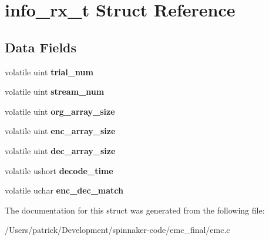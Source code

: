 \hypertarget{structinfo__rx__t}{}\section{info\+\_\+rx\+\_\+t Struct Reference}
\label{structinfo__rx__t}
\subsection*{Data Fields}
\begin{DoxyCompactItemize}
\item 
volatile uint {\bfseries trial\+\_\+num}\hypertarget{structinfo__rx__t_acaca41d7925c2322500b42835a31578f}{}\label{structinfo__rx__t_acaca41d7925c2322500b42835a31578f}

\item 
volatile uint {\bfseries stream\+\_\+num}\hypertarget{structinfo__rx__t_a2365c36107afec7da22200ed1fdd51bc}{}\label{structinfo__rx__t_a2365c36107afec7da22200ed1fdd51bc}

\item 
volatile uint {\bfseries org\+\_\+array\+\_\+size}\hypertarget{structinfo__rx__t_a47b036de602064b79b25f47190f40545}{}\label{structinfo__rx__t_a47b036de602064b79b25f47190f40545}

\item 
volatile uint {\bfseries enc\+\_\+array\+\_\+size}\hypertarget{structinfo__rx__t_a6134272a13fdffb27d49f3865947754f}{}\label{structinfo__rx__t_a6134272a13fdffb27d49f3865947754f}

\item 
volatile uint {\bfseries dec\+\_\+array\+\_\+size}\hypertarget{structinfo__rx__t_abd34f837ab3fee47974012de045e790c}{}\label{structinfo__rx__t_abd34f837ab3fee47974012de045e790c}

\item 
volatile ushort {\bfseries decode\+\_\+time}\hypertarget{structinfo__rx__t_aabccf4dd7e5143dbef1de02c599834d8}{}\label{structinfo__rx__t_aabccf4dd7e5143dbef1de02c599834d8}

\item 
volatile uchar {\bfseries enc\+\_\+dec\+\_\+match}\hypertarget{structinfo__rx__t_ae178d253255bf9eab2297747c5453490}{}\label{structinfo__rx__t_ae178d253255bf9eab2297747c5453490}

\end{DoxyCompactItemize}


The documentation for this struct was generated from the following file\+:\begin{DoxyCompactItemize}
\item 
/\+Users/patrick/\+Development/spinnaker-\/code/emc\+\_\+final/emc.\+c\end{DoxyCompactItemize}
